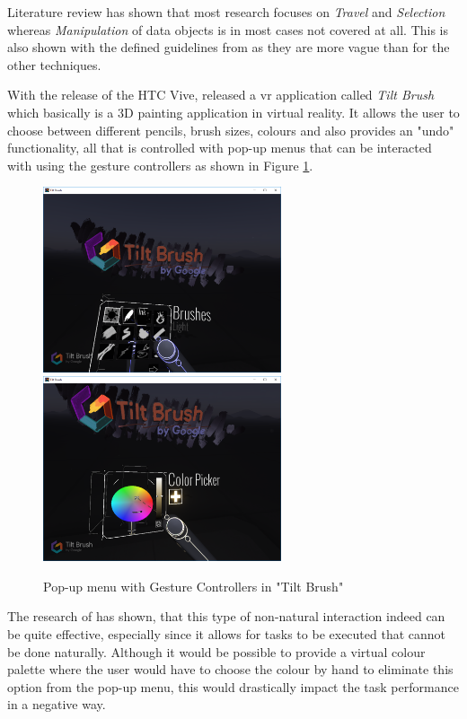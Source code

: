 Literature review has shown that most research focuses on \textit{Travel} and \textit{Selection} whereas \textit{Manipulation} of data objects is in most cases not covered at all. This is also shown with the defined guidelines from \cite{Bowman2002} as they are more vague than for the other techniques.

With the release of the HTC Vive, \cite{Google2016} released a \gls{vr} application called \textit{Tilt Brush} which basically is a 3D painting application in virtual reality. It allows the user to choose between different pencils, brush sizes, colours and also provides an "undo" functionality, all that is controlled with pop-up menus that can be interacted with using the gesture controllers as shown in Figure \ref{fig:tiltBrushMenus}.
\begin{figure}[h]
	\begin{center}
		\includegraphics[width=7cm]{03_Figures/05_LitReview/Google2016_TiltBrush.png}
		\includegraphics[width=7cm]{03_Figures/05_LitReview/Google2016_TiltBrush2.png}
		\caption[Pop-up menu with Gesture Controllers in "Tilt Brush"]{Pop-up menu with Gesture Controllers in "Tilt Brush" \citep{Google2016}}
		\label{fig:tiltBrushMenus}
	\end{center}
\end{figure} \newline
The research of \cite{Bowman2002} has shown, that this type of non-natural interaction indeed can be quite effective, especially since it allows for tasks to be executed that cannot be done naturally. Although it would be possible to provide a virtual colour palette where the user would have to choose the colour by hand to eliminate this option from the pop-up menu, this would drastically impact the task performance in a negative way.


